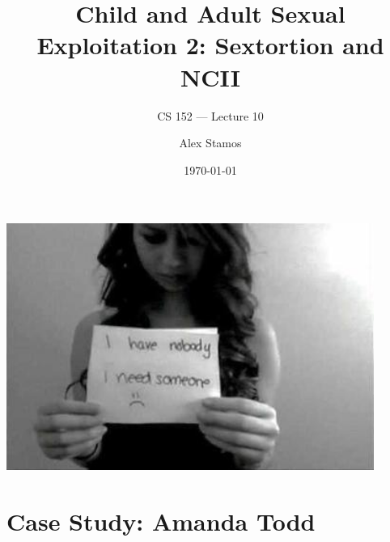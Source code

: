 \documentclass[nobackground,dvipsnames,table,aspectratio=169]{beamer}
\title{Child and Adult Sexual Exploitation 2: Sextortion and NCII}
\subtitle{CS 152 --- Lecture 10}
\author[A. Stamos]{Alex Stamos}
\institute[Stanford University]{Stanford Cyber Policy Center}
\date[2022]{\today}
\begin{document}
\begin{frame}
    \titlepage
\end{frame}

\begin{frame}{}
    \thispagestyle{empty}
\end{frame}

\begin{frame}{}
    \centering
    \href{}{\includegraphics[width=0.9\textwidth]{amanda-todd-photo}}
\end{frame}

\section{Case Study: Amanda Todd}
\end{document}
